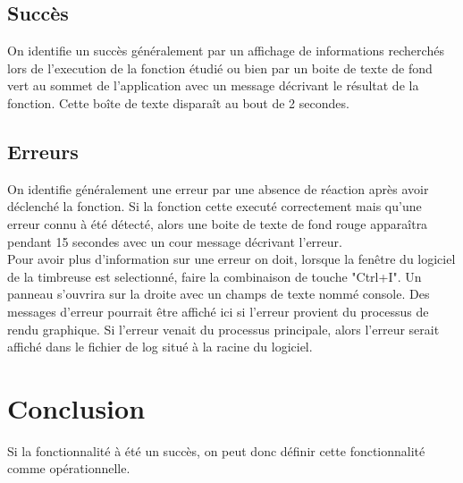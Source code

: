 \documentclass[10pt,a4paper,onecolumn]{article}
\begin{document}
\subsection{Succès}
On identifie un succès généralement par un affichage de informations recherchés lors de l'execution de la fonction étudié ou bien par un boite de texte de fond vert au sommet de l'application avec un message décrivant le résultat de la fonction. Cette boîte de texte disparaît au bout de 2 secondes.
\subsection{Erreurs}
On identifie généralement une erreur par une absence de réaction après avoir déclenché la fonction. Si la fonction cette executé correctement mais qu'une erreur connu à été détecté, alors une boite de texte de fond rouge apparaîtra pendant 15 secondes avec un cour message décrivant l'erreur.
\\
Pour avoir plus d'information sur une erreur on doit, lorsque la fenêtre du logiciel de la timbreuse est selectionné, faire la combinaison de touche "Ctrl+I". Un panneau s'ouvrira sur la droite avec un champs de texte nommé console. Des messages d'erreur pourrait être affiché ici si l'erreur provient du processus de rendu graphique. Si l'erreur venait du processus principale, alors l'erreur serait affiché dans le fichier de log situé à la racine du logiciel.
\section{Conclusion}
Si la fonctionnalité à été un succès, on peut donc définir cette fonctionnalité comme opérationnelle. 
\end{document}
